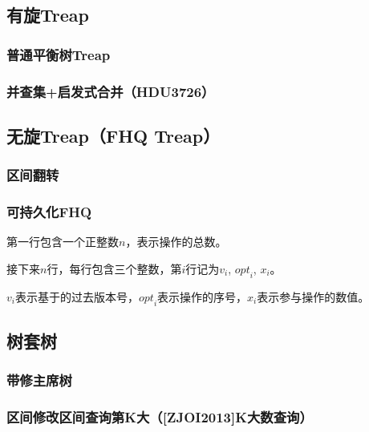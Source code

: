 \documentclass[twoside,a4paper]{article}
\begin{document}
\subsection{有旋Treap}
\subsubsection{普通平衡树Treap}


\subsubsection{并查集+启发式合并（HDU3726）}



\subsection{无旋Treap（FHQ Treap）}
\subsubsection{区间翻转}


\subsubsection{可持久化FHQ}
第一行包含一个正整数$n$，表示操作的总数。\par
接下来$n$行，每行包含三个整数，第$i$行记为${v}_{i}$, ${opt}_i$, $x_i$。\par
$v_i$表示基于的过去版本号，${opt}_i$表示操作的序号，$x_i$表示参与操作的数值。



\subsection{树套树}

\subsubsection{带修主席树}


\subsubsection{区间修改区间查询第K大（[ZJOI2013]K大数查询）}

\end{document}

